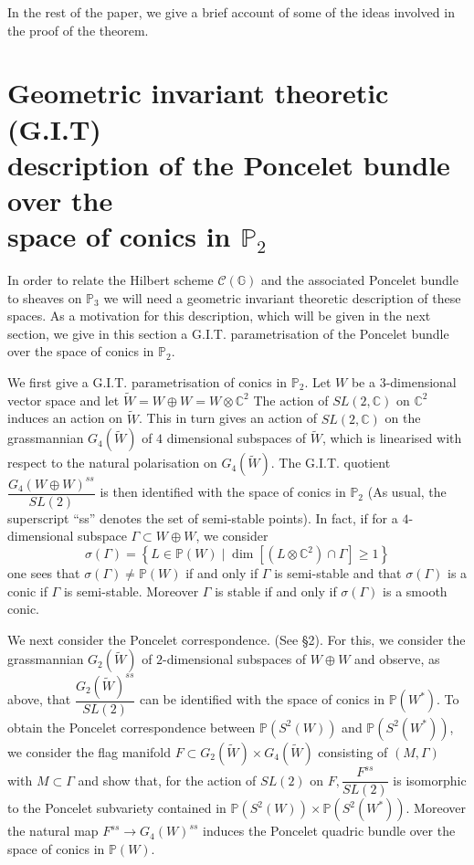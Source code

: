 In the rest of the paper, we give a brief account of some of the ideas
involved in the proof of the theorem. 


\section[Geometric invariant theoretic...]{Geometric invariant theoretic (G.I.T)\\ description of the
  Poncelet bundle over the\\ space of conics in \texorpdfstring{$\mathbb{P}_2$}{eq}}\label{s4}\pageoriginale


In order to relate the Hilbert scheme $\mathscr{C}(\mathbb{G})$ and
the associated Poncelet bundle to sheaves on $\mathbb{P}_3$ we will
need a geometric invariant theoretic description of these spaces. As a
motivation for this description, which will be given in the next
section, we give in this section a G.I.T. parametrisation of the
Poncelet bundle over the space of conics in $\mathbb{P}_2$. 

We first give a G.I.T. parametrisation of conics in
$\mathbb{P}_2$. Let $W$ be a $3$-dimensional vector space and let
$\widetilde{W}=W\oplus W=W\otimes \mathbb{C}^{2}$ The action of
$SL(2,\mathbb{C})$ on $\mathbb{C}^{2}$ induces an action on
$\widetilde{W}$. This in turn gives an action of $SL(2,\mathbb{C})$ on
the grassmannian $G_4\left(\widetilde{W}\right)$ of $4$ dimensional
subspaces of $\widetilde{W}$, which is linearised with respect to the
natural polarisation on $G_4\left(\widetilde{W}\right)$. The
G.I.T. quotient $\dfrac{G_4\left(W\oplus W\right)^{ss}}{SL(2)}$ is
then identified with the space of conics in $\mathbb{P}_2$ (As usual,
the superscript ``ss'' denotes the set of semi-stable points). In
fact, if for a $4$-dimensional subspace $\Gamma \subset W\oplus W$, we
consider 
$$
\sigma(\Gamma)=\left\{L\in \mathbb{P}(W)\mid \dim
\left[\left(L\otimes \mathbb{C}^{2}\right)\cap \Gamma\right]\geq 1\right\}
$$
one sees that $\sigma(\Gamma)\neq \mathbb{P}(W)$ if and only if
$\Gamma$ is semi-stable and that $\sigma(\Gamma)$ is a conic if
$\Gamma$ is semi-stable. Moreover $\Gamma$ is stable if and only if
$\sigma(\Gamma)$ is a smooth conic. 

We next consider the Poncelet correspondence. (See \S 2). For this, we
consider the grassmannian $G_2\left(\widetilde{W}\right)$ of
$2$-dimensional subspaces\pageoriginale
 of $W\oplus W$ and observe, as above, that
$\dfrac{G_2\left(\widetilde{W}\right)^{ss}}{SL(2)}$ can be identified
with the space of conics in $\mathbb{P}\left(W^{\ast}\right)$. To
obtain the Poncelet correspondence between
$\mathbb{P}\left(S^{2}(W)\right)$ and
$\mathbb{P}\left(S^{2}\left(W^{\ast}\right)\right)$, we consider the
flag manifold $F\subset G_2\left(\widetilde{W}\right)\times
G_4\left(\widetilde{W}\right)$ consisting of $(M,\Gamma)$ with
$M\subset \Gamma$ and show that, for the action of $SL(2)$ on
$F,\dfrac{F^{ss}}{SL(2)}$ is isomorphic to the Poncelet subvariety
contained in $\mathbb{P}\left(S^{2}\left(W\right)\right)\times
\mathbb{P}\left(S^{2}\left(W^{\ast}\right)\right)$. Moreover the
natural map $F^{ss}\to G_4(W)^{ss}$ induces the Poncelet quadric
bundle over the space of conics in $\mathbb{P}(W)$. 

